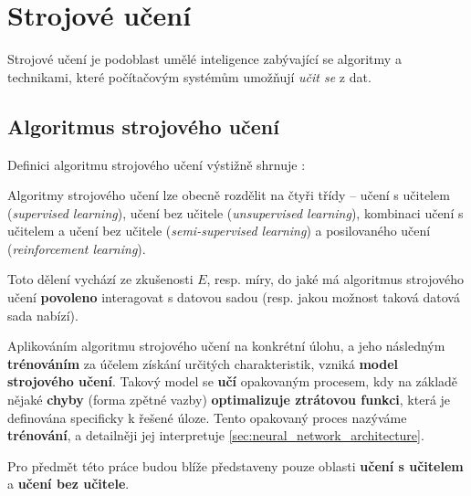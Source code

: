 \section{Strojové učení}
\label{sec:machine_learning}
Strojové učení je podoblast umělé inteligence zabývající se algoritmy a technikami, které počítačovým systémům umožňují \emph{učit se} z dat.
\begin{definition}
    \label{def:machine_learning}
     \cite{Samuel1967}
\end{definition}
\subsection{Algoritmus strojového učení}
\label{sec:machine_learning_algorithm}
Definici algoritmu strojového učení výstižně shrnuje \textcite[str. 2]{Mitchell1997}:
\begin{definition}
    \label{def:machine_learning_algorithm}
\end{definition}
Algoritmy strojového učení lze obecně rozdělit na čtyři třídy – učení s učitelem (\emph{supervised learning}),
učení bez učitele (\emph{unsupervised learning}), kombinaci učení s učitelem a učení bez učitele (\emph{semi-supervised learning}) a posilovaného učení (\emph{reinforcement learning}).

Toto dělení vychází ze zkušenosti $E$, resp. míry, do jaké má algoritmus strojového učení \textbf{povoleno} interagovat s datovou sadou (resp. jakou možnost taková datová sada nabízí). \cite{Goodfellow2016}

Aplikováním algoritmu strojového učení na konkrétní úlohu, a jeho následným \textbf{trénováním} za účelem získání určitých charakteristik, vzniká \textbf{model strojového učení}.
Takový model se \textbf{učí} opakovaným procesem, kdy na základě nějaké \textbf{chyby} (forma zpětné vazby) \textbf{optimalizuje ztrátovou funkci}, která je definována specificky k řešené úloze.
Tento opakovaný proces nazýváme \textbf{trénování}, a detailněji jej interpretuje \autoref{sec:neural_network_architecture}.

Pro předmět této práce budou blíže představeny pouze oblasti \textbf{učení s učitelem} a \textbf{učení bez učitele}.
